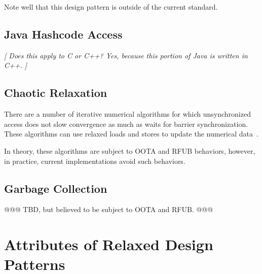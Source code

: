\documentclass[10]{article}
\begin{document}
Note well that this design pattern is outside of the current standard.

\subsection{Java Hashcode Access}
\label{sec:Java Hashcode Access}

\emph{[ Does this apply to C or C++?
Yes, because this portion of Java is written in C++. ]}

\subsection{Chaotic Relaxation}
\label{sec:Chaotic Relaxation}

There are a number of iterative numerical algorithms for which unsynchronized
access does not slow convergence as much as waits for barrier synchronization.
These algorithms can use relaxed loads and stores to update the numerical
data~\cite{Andrews91textbook}.

In theory, these algorithms are subject to OOTA and RFUB behaviors, however,
in practice, current implementations avoid such behaviors.

\subsection{Garbage Collection}
\label{sec:Garbage Collection}

@@@ TBD, but believed to be subject to OOTA and RFUB. @@@

\section{Attributes of Relaxed Design Patterns}
\label{sec:Attributes of Relaxed Design Patterns}
\end{document}
